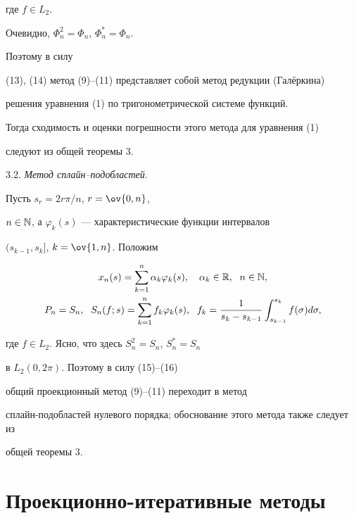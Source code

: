 где $f\in L_2$.


Очевидно, $\Phi_n^2=\Phi_n$, $\Phi_n^\ast =\Phi_n$.


Поэтому в силу


(13), (14) метод (9)--(11) представляет собой метод редукции (Гал\"еркина)


решения уравнения (1) по тригонометрической системе функций.


Тогда сходимость и оценки погрешности этого метода для уравнения (1)


следуют из общей теоремы 3.


\medskip





3.2. {\it Метод сплайн--подобластей.}


Пусть $s_r=2r\pi /n$, $r=\ov{0,n}$,


$n\in \Bbb N$, а $\varphi_k(s)$ --- характеристические функции интервалов


$(s_{k-1},s_k]$, $ k=\ov{1,n} $. Положим


\begin{gather}


x_n(s)=\sum_{k=1}^n\alpha_k \varphi_k(s),\quad \alpha_k\in \Bbb R,


\ \; n\in \Bbb N, \\


%


P_n=S_n,\ \; S_n(f;s)= \sum_{k=1}^nf_k \varphi_k(s),\ \;


f_k=\frac{1}{s_k-s_{k-1}}\int_{s_{k-1}}^{s_k}f(\sigma) d\sigma,


\end{gather}


где $f\in L_2$. Ясно, что здесь $S_n^2=S_n$, $S_n^\ast =S_n$


в $L_2(0,2\pi)$. Поэтому в силу (15)--(16)


общий проекционный метод (9)--(11) переходит в метод


сплайн-подобластей нулевого порядка; обоснование этого метода также следует из


общей теоремы 3.





\section{Проекционно-итеративные методы}





